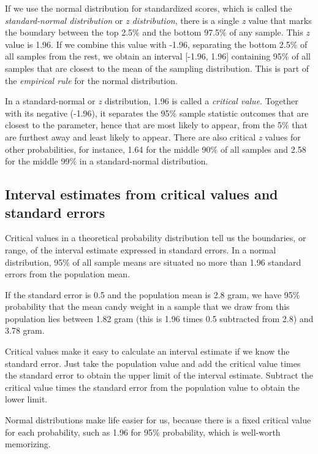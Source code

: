 \documentclass[a4paper]{book}
\theoremstyle{definition}
\theoremstyle{definition}
\theoremstyle{definition}
\theoremstyle{remark}
\begin{document}
If we use the normal distribution for standardized scores, which is
called the \emph{standard-normal distribution} or \emph{z distribution},
there is a single \emph{z} value that marks the boundary between the top
2.5\% and the bottom 97.5\% of any sample. This \emph{z} value is 1.96.
If we combine this value with -1.96, separating the bottom 2.5\% of all
samples from the rest, we obtain an interval {[}-1.96, 1.96{]}
containing 95\% of all samples that are closest to the mean of the
sampling distribution. This is part of the \emph{empirical rule} for the
normal distribution.

In a standard-normal or \emph{z} distribution, 1.96 is called a
\emph{critical value}. Together with its negative (-1.96), it separates
the 95\% sample statistic outcomes that are closest to the parameter,
hence that are most likely to appear, from the 5\% that are furthest
away and least likely to appear. There are also critical \emph{z} values
for other probabilities, for instance, 1.64 for the middle 90\% of all
samples and 2.58 for the middle 99\% in a standard-normal distribution.

\subsection{Interval estimates from critical values and standard
errors}\label{int-est-sample-mean}

Critical values in a theoretical probability distribution tell us the
boundaries, or range, of the interval estimate expressed in standard
errors. In a normal distribution, 95\% of all sample means are situated
no more than 1.96 standard errors from the population mean.

If the standard error is 0.5 and the population mean is 2.8 gram, we
have 95\% probability that the mean candy weight in a sample that we
draw from this population lies between 1.82 gram (this is 1.96 times 0.5
subtracted from 2.8) and 3.78 gram.

Critical values make it easy to calculate an interval estimate if we
know the standard error. Just take the population value and add the
critical value times the standard error to obtain the upper limit of the
interval estimate. Subtract the critical value times the standard error
from the population value to obtain the lower limit.

Normal distributions make life easier for us, because there is a fixed
critical value for each probability, such as 1.96 for 95\% probability,
which is well-worth memorizing.
\end{document}
